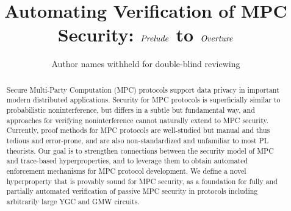 \documentclass[acmsmall,screen,review]{acmart}
\begin{document}
\title{Automating Verification of MPC Security: $\mathit{Prelude}$ to $\mathit{Overture}$}

\author{Author names withheld for double-blind reviewing}

\begin{abstract}
Secure Multi-Party Computation (MPC) protocols support data privacy in
important modern distributed applications. Security for MPC protocols
is superficially similar to probabilistic noninterference, but differs
in a subtle but fundamental way, and approaches for verifying
noninterference cannot naturally extend to MPC security.  Currently,
proof methods for MPC protocols are well-studied but manual
and thus tedious and error-prone, and are also non-standardized and
unfamiliar to most PL theorists.  Our goal is to strengthen
connections between the security model of MPC and trace-based
hyperproperties, and to leverage them to obtain automated
enforcement mechanisms for MPC protocol development.  We define a
novel hyperproperty that is provably sound for MPC security, as a
foundation for fully and partially automated verification of passive
MPC security in protocols including arbitrarily large YGC and GMW
circuits.
\end{abstract}

\maketitle















%




\appendix



%






\end{document}
